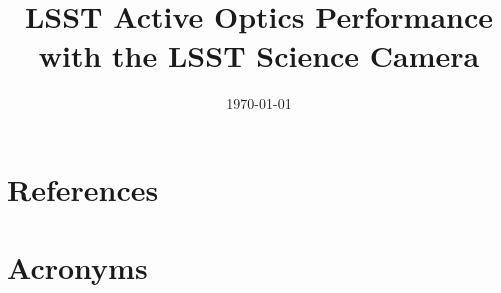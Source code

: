 \documentclass[modern]{aastex62}
\begin{document}

\date{\today}
\title{LSST Active Optics Performance with the LSST Science Camera}





\appendix

\section{References} \label{sec:bib}



\section{Acronyms} \label{sec:acronyms}

\end{document}
